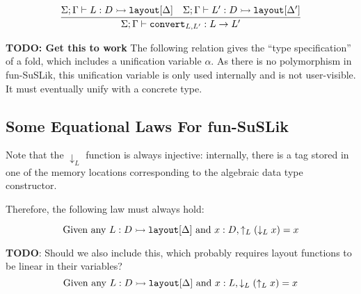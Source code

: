 \documentclass[10pt]{article}
\begin{document}
\[\begin{array}{c}
    \\\\
    \infer{\Sigma ; \Gamma \vdash \ttt{convert}_{L,L'} : L \ra L'}
          {\Sigma ; \Gamma \vdash L : D \hra \ttt{layout}[\Delta] & \Sigma ; \Gamma \vdash L' : D \hra \ttt{layout}[\Delta']}
  \end{array}
\]

\textbf{TODO: Get this to work}
\noindent
The following relation gives the ``type specification'' of a fold, which includes a unification variable $\alpha$. As there is no
polymorphism in fun-SuSLik, this unification variable is only used internally and is not user-visible. It must eventually
unify with a concrete type.



%

\subsection{Some Equational Laws For fun-SuSLik}

Note that the $\downarrow_L$ function is always injective: internally, there is a tag stored in one of the memory locations corresponding
to the algebraic data type constructor.

\noindent
Therefore, the following law must always hold:

\[
  \textnormal{Given any } L : D \rightarrowtail \texttt{layout}[\Delta] \textnormal{ and } x : D, \uparrow_L (\downarrow_L x) = x
\]

\noindent
\textbf{TODO}: Should we also include this, which probably requires layout functions to be linear in their variables?
\[
  \textnormal{Given any } L : D \rightarrowtail \texttt{layout}[\Delta] \textnormal{ and } x : L, \downarrow_L (\uparrow_L x) = x
\]
\end{document}

